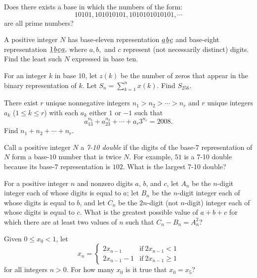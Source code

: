 \documentclass[mast]{lucky}
\begin{document}
\begin{prob}[PAMO 2003/3]{2}
Does there exists a base in which the numbers of the form:
\[ 10101, 101010101, 1010101010101,\cdots \]
are all prime numbers?
\end{prob}

\begin{prob}[AIME I 2020/3]{2}
A positive integer $N$ has base-eleven representation $\underline{a}\kern 0.1em\underline{b}\kern 0.1em\underline{c}$ and base-eight representation $\underline1\kern 0.1em\underline{b}\kern 0.1em\underline{c}\kern 0.1em\underline{a},$ where $a,b,$ and $c$ represent (not necessarily distinct) digits. Find the least such $N$ expressed in base ten.
\end{prob}

\begin{prob}[ARML 2000]{3}
For an integer $k$ in base $10$, let $z(k)$ be the number of zeros that appear in the binary representation of $k$. Let $S_n=\sum_{k=1}^n x(k)$. Find $S_{256}$. 
\end{prob}

\begin{prob}[AIME 2008 II/4]{3}
There exist $ r$ unique nonnegative integers $ n_1 > n_2 > \cdots > n_r$ and $ r$ unique integers $ a_k$ ($ 1\le k\le r$) with each $ a_k$ either $ 1$ or $ - 1$ such that
\[ a_13^{n_1} + a_23^{n_2} + \cdots + a_r3^{n_r} = 2008.
\]Find $ n_1 + n_2 + \cdots + n_r$.
\end{prob}

\begin{prob}[AIME I 2001/8]{3}
Call a positive integer $N$ a \textit{7-10 double} if the digits of the base-$7$ representation of $N$ form a base-$10$ number that is twice $N$. For example, $51$ is a 7-10 double because its base-$7$ representation is $102$. What is the largest 7-10 double?
\end{prob}

\begin{prob}[AMC 10A 2018/25]{4}
For a positive integer $n$ and nonzero digits $a$, $b$, and $c$, let $A_n$ be the $n$-digit integer each of whose digits is equal to $a$; let $B_n$ be the $n$-digit integer each of whose digits is equal to $b$, and let $C_n$ be the $2n$-digit (not $n$-digit) integer each of whose digits is equal to $c$. What is the greatest possible value of $a + b + c$ for which there are at least two values of $n$ such that $C_n - B_n = A_n^2$?
\end{prob}


\begin{prob}[AHSME 1993/30]{6}
Given $0 \le x_0 <1$, let
\[ x_n= 
     \begin{cases}
       2x_{n-1} & \text{if}\ 2x_{n-1} <1 \\
       2x_{n-1}-1 & \text{if}\ 2x_{n-1} \ge 1
     \end{cases} \]for all integers $n>0$. For how many $x_0$ is it true that $x_0=x_5$?
\end{prob}
\end{document}
